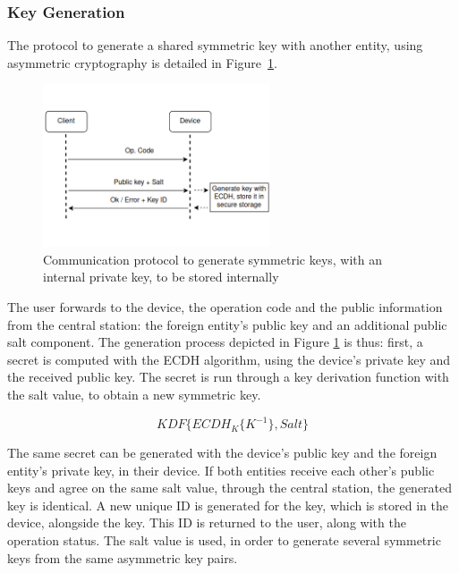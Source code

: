 \subsubsection*{Key Generation}\label{chap:arch:services:new-comms:ecdh}

The protocol to generate a shared symmetric key with another entity, using asymmetric cryptography is detailed in Figure~\ref{fig:protocol:ecdh}.
\begin{figure}[h!]
	\centering
	\includegraphics[width=0.60\textwidth]{./Images/ecdh.png}
	\caption{Communication protocol to generate symmetric keys, with an internal private key, to be stored internally}
	\label{fig:protocol:ecdh}
\end{figure}

The user forwards to the device, the operation code and the public information from the central station: the foreign entity's public key and an additional public salt component.
The generation process depicted in Figure \ref{fig:protocol:ecdh} is thus: first, a secret is computed with the ECDH algorithm, using the device's private key and the received public key. The secret is run through a key derivation function with the salt value, to obtain a new symmetric key.

\begin{equation}
	\label{eq:ecdh-kdf}
	KDF\{ECDH_{K}\{K^{-1}\}, Salt\}
\end{equation}

The same secret can be generated with the device's public key and the foreign entity's private key, in their device. If both entities receive each other's public keys and agree on the same salt value, through the central station, the generated key is identical.
A new unique ID is generated for the key, which is stored in the device, alongside the key. This ID is returned to the user, along with the operation status.
The salt value is used, in order to generate several symmetric keys from the same asymmetric key pairs.

